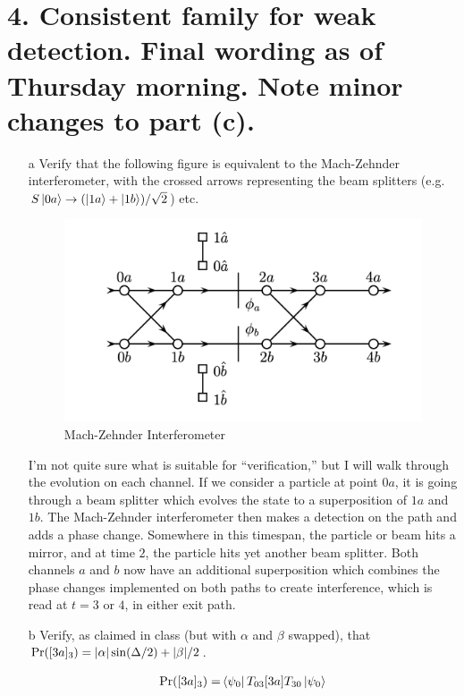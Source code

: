 \documentclass[a4paper,twoside]{article}
\begin{document}
\section*{4. Consistent family for weak detection. Final wording as of Thursday morning. Note minor changes to part (c).}
\begin{itemize}
    \item[a] Verify that the following figure is equivalent to the Mach-Zehnder interferometer, with the crossed arrows representing the beam splitters (e.g. $ S \ket{0a} \to (\ket{1a} + \ket{1b})/ \sqrt{2} $) etc.
        \begin{figure}[h]
            \centering
            \includegraphics[width=0.7\columnwidth]{fig_hw4_4.png}
            \caption{Mach-Zehnder Interferometer}
            \label{fig:mz_inter}
        \end{figure}
        \begin{tcolorbox}[breakable]
            I'm not quite sure what is suitable for ``verification,'' but I will walk through the evolution on each channel. If we consider a particle at point $ 0a $, it is going through a beam splitter which evolves the state to a superposition of $ 1a $ and $ 1b $. The Mach-Zehnder interferometer then makes a detection on the path and adds a phase change. Somewhere in this timespan, the particle or beam hits a mirror, and at time $ 2 $, the particle hits yet another beam splitter. Both channels $ a $ and $ b $ now have an additional superposition which combines the phase changes implemented on both paths to create interference, which is read at $ t=3 $ or $ 4 $, in either exit path.
        \end{tcolorbox}
    \item[b] Verify, as claimed in class (but with $ \alpha $ and $\beta$ swapped), that $ \Pr([3a]_3) = \abs{\alpha} \sin(\Delta/2) + \abs{\beta}/2 $.
        \begin{tcolorbox}[breakable]
            \begin{align}
                \Pr([3a]_3) =& \bra{\psi_0} T_{03} [3a] T_{30} \ket{\psi_0}\\

\end{align}
\end{tcolorbox}
\end{itemize}
\end{document}
